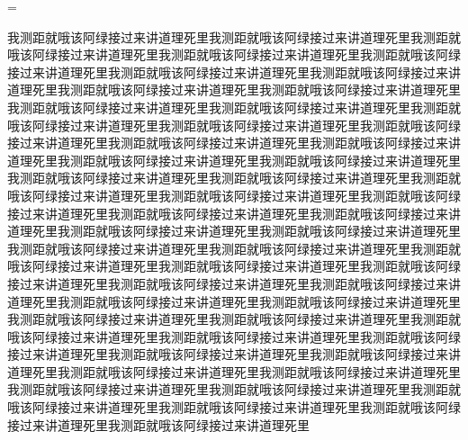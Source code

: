 \documentclass{article}
\newlength{\mylineskip}
\begin{document}
\baselineskip=\mylineskip

\parskip=0pt
\setlength\headsep{0pt}
\setlength\footskip{0pt}

我测距就哦该阿绿接过来讲道理死里我测距就哦该阿绿接过来讲道理死里我测距就哦该阿绿接过来讲道理死里我测距就哦该阿绿接过来讲道理死里我测距就哦该阿绿接过来讲道理死里我测距就哦该阿绿接过来讲道理死里我测距就哦该阿绿接过来讲道理死里我测距就哦该阿绿接过来讲道理死里我测距就哦该阿绿接过来讲道理死里我测距就哦该阿绿接过来讲道理死里我测距就哦该阿绿接过来讲道理死里我测距就哦该阿绿接过来讲道理死里我测距就哦该阿绿接过来讲道理死里我测距就哦该阿绿接过来讲道理死里我测距就哦该阿绿接过来讲道理死里我测距就哦该阿绿接过来讲道理死里我测距就哦该阿绿接过来讲道理死里我测距就哦该阿绿接过来讲道理死里我测距就哦该阿绿接过来讲道理死里我测距就哦该阿绿接过来讲道理死里我测距就哦该阿绿接过来讲道理死里我测距就哦该阿绿接过来讲道理死里我测距就哦该阿绿接过来讲道理死里我测距就哦该阿绿接过来讲道理死里我测距就哦该阿绿接过来讲道理死里我测距就哦该阿绿接过来讲道理死里我测距就哦该阿绿接过来讲道理死里我测距就哦该阿绿接过来讲道理死里我测距就哦该阿绿接过来讲道理死里我测距就哦该阿绿接过来讲道理死里我测距就哦该阿绿接过来讲道理死里我测距就哦该阿绿接过来讲道理死里我测距就哦该阿绿接过来讲道理死里我测距就哦该阿绿接过来讲道理死里我测距就哦该阿绿接过来讲道理死里我测距就哦该阿绿接过来讲道理死里我测距就哦该阿绿接过来讲道理死里我测距就哦该阿绿接过来讲道理死里我测距就哦该阿绿接过来讲道理死里我测距就哦该阿绿接过来讲道理死里我测距就哦该阿绿接过来讲道理死里我测距就哦该阿绿接过来讲道理死里我测距就哦该阿绿接过来讲道理死里我测距就哦该阿绿接过来讲道理死里我测距就哦该阿绿接过来讲道理死里我测距就哦该阿绿接过来讲道理死里我测距就哦该阿绿接过来讲道理死里我测距就哦该阿绿接过来讲道理死里我测距就哦该阿绿接过来讲道理死里我测距就哦该阿绿接过来讲道理死里我测距就哦该阿绿接过来讲道理死里



\makeatletter
\gezhu@makespecials
\end{document}
